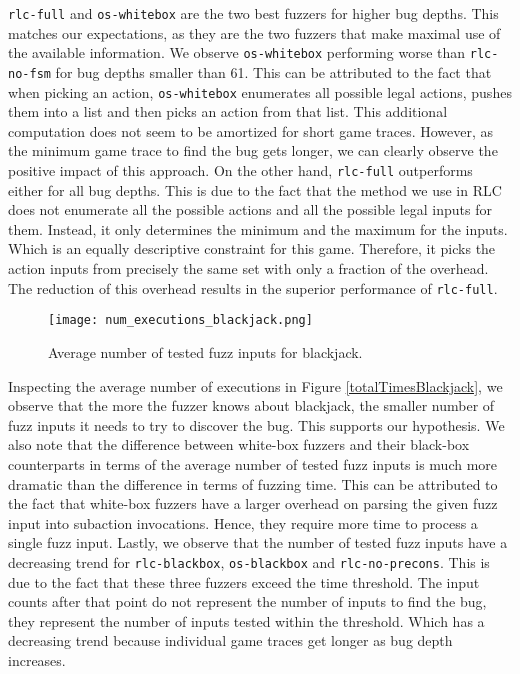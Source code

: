 \texttt{rlc-full} and \texttt{os-whitebox} are the two best fuzzers for higher bug depths.
This matches our expectations, as they are the two fuzzers that make maximal use of the available information.
We observe \texttt{os-whitebox} performing worse than \texttt{rlc-no-fsm} for bug depths smaller than 61.
This can be attributed to the fact that when picking an action, \texttt{os-whitebox} enumerates all possible legal actions, pushes them into a list and then picks an action from that list.
This additional computation does not seem to be amortized for short game traces.
However, as the minimum game trace to find the bug gets longer, we can clearly observe the positive impact of this approach.
On the other hand, \texttt{rlc-full} outperforms either for all bug depths.
This is due to the fact that the method we use in RLC does not enumerate all the possible actions and all the possible legal inputs for them.
Instead, it only determines the minimum and the maximum for the inputs.
Which is an equally descriptive constraint for this game.
Therefore, it picks the action inputs from precisely the same set with only a fraction of the overhead.
The reduction of this overhead results in the superior performance of \texttt{rlc-full}.

\begin{figure}[h]
    \centering
    \texttt{[image: num\_executions\_blackjack.png]}
    \caption{Average number of tested fuzz inputs for blackjack.}
    \label{avgInputsBlackjack}
\end{figure}

Inspecting the average number of executions in Figure \ref{totalTimesBlackjack}, we observe that the more the fuzzer knows about blackjack, the smaller number of fuzz inputs it needs to try to discover the bug.
This supports our hypothesis.
We also note that the difference between white-box fuzzers and their black-box counterparts in terms of the average number of tested fuzz inputs is 
much more dramatic than the difference in terms of fuzzing time. 
This can be attributed to the fact that white-box fuzzers have a larger overhead on parsing the given fuzz input into subaction invocations.
Hence, they require more time to process a single fuzz input.
Lastly, we observe that the number of tested fuzz inputs have a decreasing trend for \texttt{rlc-blackbox}, \texttt{os-blackbox} and \texttt{rlc-no-precons}.
This is due to the fact that these three fuzzers exceed the time threshold.
The input counts after that point do not represent the number of inputs to find the bug, they represent the number of inputs tested within the threshold.
Which has a decreasing trend because individual game traces get longer as bug depth increases.
